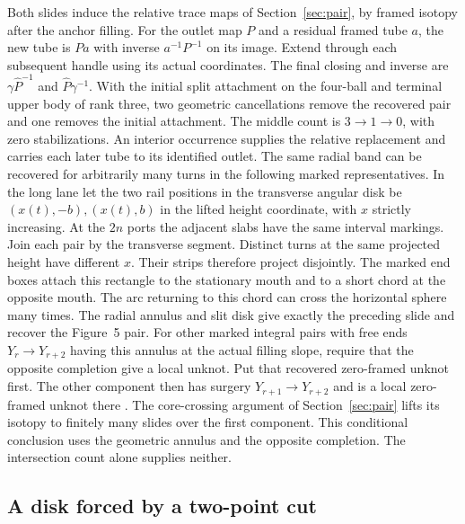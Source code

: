 \documentclass[11pt,letterpaper]{article}
\numberwithin{equation}{section}
\theoremstyle{remark}
\begin{document}
Both slides induce the relative trace maps of
Section~\ref{sec:pair}, by framed isotopy after the anchor filling.
For the outlet map \(P\) and a residual framed tube \(a\), the new
tube is \(Pa\) with inverse \(a^{-1}P^{-1}\) on its image.
Extend through each subsequent handle using its actual coordinates.
The final closing and inverse are \(\gamma\widehat P^{-1}\) and
\(\widehat P\gamma^{-1}\). With the initial split attachment on the
four-ball and terminal upper body of rank three, two geometric
cancellations remove the recovered pair and one removes the initial
attachment. The middle count is \(3\to1\to0\), with zero stabilizations.
An interior occurrence supplies the relative replacement and carries
each later tube to its identified outlet.
The same radial band can be recovered for arbitrarily many turns
in the following marked representatives. In the long lane let the two
rail positions in the transverse angular disk be
\((x(t),-b),(x(t),b)\) in the lifted height coordinate, with \(x\)
strictly increasing. At the \(2n\) ports the adjacent slabs have
the same interval markings. Join each pair by the transverse segment.
Distinct turns at the same projected height have different \(x\).
Their strips therefore project disjointly. The marked end boxes
attach this rectangle to the stationary mouth and to a short chord
at the opposite mouth. The arc returning to this chord can cross
the horizontal sphere many times. The radial annulus and slit disk
give exactly the preceding slide and recover the Figure~5 pair.
For other marked integral pairs with free ends \(Y_r\to Y_{r+2}\)
having this annulus at the actual filling slope, require that the
opposite completion give a local unknot. Put that recovered zero-framed
unknot first. The other component then has surgery
\(Y_{r+1}\to Y_{r+2}\) and is a local zero-framed unknot there
\cite[Theorem 5.1]{MeierSchirmerZupan2016Trisections}.
The core-crossing argument of Section~\ref{sec:pair} lifts its
isotopy to finitely many slides over the first component. This
conditional conclusion uses the geometric annulus and the opposite
completion. The intersection count alone supplies neither.

\subsection{A disk forced by a two-point cut}\label{sec:two-port}
\end{document}
